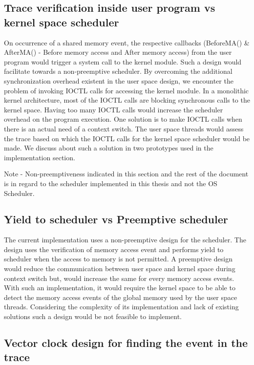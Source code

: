 \subsection{Trace verification inside user program vs kernel space scheduler}

On occurrence of a shared memory event, the respective callbacks (BeforeMA() \& AfterMA() - Before memory access and After memory access) from the user program would trigger a system call to the kernel module. 
Such a design would facilitate towards a non-preemptive scheduler. 
By overcoming the additional synchronization overhead existent in the user space design, we encounter the problem of invoking IOCTL calls  for accessing the kernel module. 
In a monolithic kernel architecture, most of the IOCTL calls are blocking synchronous calls to the kernel space. 
Having too many IOCTL calls would increase the scheduler overhead on the program execution. 
One solution is to make IOCTL calls when there is an actual need of a  context switch. 
The user space threads would assess the trace based on which the IOCTL calls for the kernel space scheduler would be made. 
We discuss about such a solution in two prototypes used in the implementation section.

Note - Non-preemptiveness indicated in this section and the rest of the document is in regard to the scheduler implemented in this thesis and not the OS Scheduler.

\subsection{Yield to scheduler vs Preemptive scheduler}

The current implementation uses a non-preemptive design for the scheduler. 
The design uses the verification of memory access event and performs yield to scheduler when the access to memory is not permitted. 
A preemptive design would reduce the communication between user space and kernel space during context switch but, would increase the same for every memory access events. 
With such an implementation, it would require the kernel space to be able to detect the memory access events of the global memory used by the user space threads. 
Considering the complexity of its implementation and lack of existing solutions such a design would be not feasible to implement. 


\subsection{Vector clock design for finding the event in the trace}

